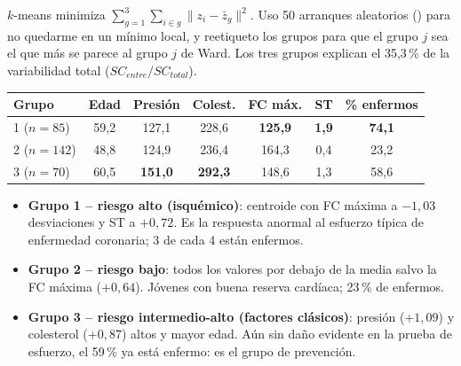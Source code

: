 $k$-means minimiza $\sum_{g=1}^{3}\sum_{i\in g}\lVert z_i-\bar z_g\rVert^2$. Uso 50 arranques aleatorios
() para no quedarme en un mínimo local, y reetiqueto los grupos para que el grupo $j$ sea el
que más se parece al grupo $j$ de Ward.
Los tres grupos explican el 35,3\,\% de la variabilidad total ($SC_{entre}/SC_{total}$).

\begin{center}\small
\begin{tabular}{lccccc|c}
\toprule
Grupo & Edad & Presión & Colest. & FC máx. & ST & \% enfermos \\ \midrule
1 ($n=85$) & 59,2 & 127,1 & 228,6 & \textbf{125,9} & \textbf{1,9} & \textbf{74,1} \\
2 ($n=142$) & 48,8 & 124,9 & 236,4 & 164,3 & 0,4 & 23,2 \\
3 ($n=70$) & 60,5 & \textbf{151,0} & \textbf{292,3} & 148,6 & 1,3 & 58,6 \\ \bottomrule
\end{tabular}
\end{center}
\begin{itemize}[leftmargin=1.2em]
  \item[\color{cRed}\faExclamationTriangle] \textbf{Grupo 1 -- riesgo alto (isquémico)}: centroide con FC
  máxima a $-1,03$ desviaciones y ST a $+0,72$. Es la respuesta anormal al esfuerzo típica de enfermedad
  coronaria; 3 de cada 4 están enfermos.
  \item[\color{cTeal}\faCheckCircle] \textbf{Grupo 2 -- riesgo bajo}: todos los valores por debajo de la media
  salvo la FC máxima ($+0,64$). Jóvenes con buena reserva cardíaca; 23\,\% de enfermos.
  \item[\color{cPurple}\faExclamationCircle] \textbf{Grupo 3 -- riesgo intermedio-alto (factores clásicos)}:
  presión ($+1,09$) y colesterol ($+0,87$) altos y mayor edad. Aún sin daño evidente en la prueba de esfuerzo,
  el 59\,\% ya está enfermo: es el grupo de prevención.
\end{itemize}

